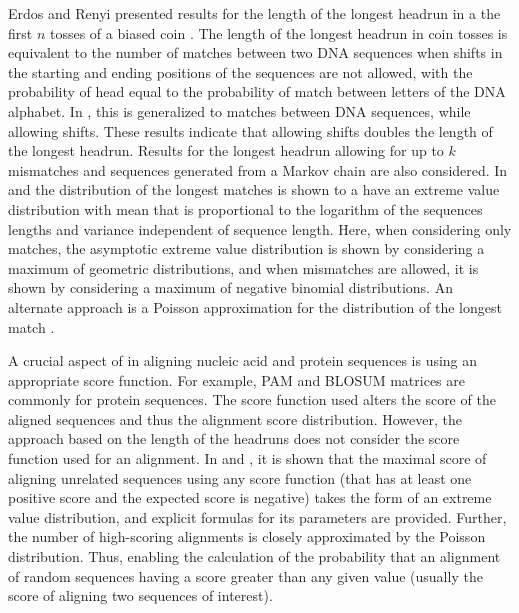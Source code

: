 Erdos and Renyi presented results for the length of the longest headrun
in a the first $n$ tosses of a biased coin \citep{erdos1975length}.  The
length of the longest headrun in coin tosses is equivalent to the number
of matches between two DNA sequences when shifts in the starting and
ending positions of the sequences are not allowed, with the probability
of head equal to the probability of match between letters of the DNA
alphabet.
In \cite{arratia1985erdos}, this is generalized to matches between DNA
sequences, while allowing shifts. These results indicate that allowing
shifts doubles the length of the longest headrun. Results for the
longest headrun allowing for up to $k$ mismatches and sequences
generated from a Markov chain are also considered.
In \cite{arratia1986extreme} and \cite{gordon1986extreme} the
distribution of the longest matches is shown to a have an extreme value
distribution with mean that is proportional to the logarithm of the
sequences lengths and variance independent of sequence length. Here,
when considering only matches, the asymptotic extreme value distribution
is shown by considering a maximum of geometric distributions, and when
mismatches are allowed, it is shown by considering a maximum of negative
binomial distributions.
An alternate approach is a Poisson approximation for the distribution of
the longest match \citep{arratia1989erdos}.

A crucial aspect of in aligning nucleic acid and protein sequences is
using an appropriate score function. For example, PAM
\citep{dayhoff197822} and BLOSUM \citep{henikoff1992amino} matrices are
commonly for protein sequences.  The score function used alters the
score of the aligned sequences and thus the alignment score
distribution.
However, the approach based on the length of the headruns does not
consider the score function used for an alignment.
%
In \cite{karlin1990methods} and \cite{karlin1990statistical}, it is
shown that the maximal score of aligning unrelated sequences using any
score function (that has at least one positive score and the expected
score is negative) takes the form of an extreme value distribution, and
explicit formulas for its parameters are provided. Further, the number
of high-scoring alignments is closely approximated by the Poisson
distribution.
%
Thus, enabling the calculation of the probability that an alignment of
random sequences having a score greater than any given value (usually
the score of aligning two sequences of interest).

